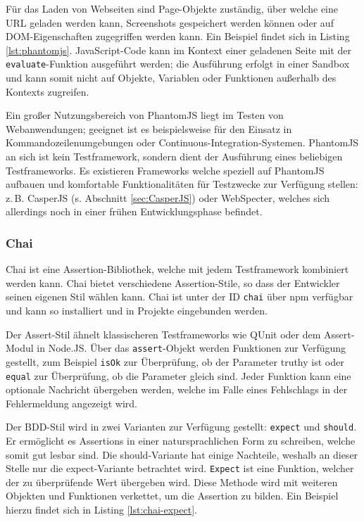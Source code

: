 Für das Laden von Webseiten sind Page-Objekte zuständig, über welche eine URL geladen werden kann, Screenshots gespeichert werden können oder auf DOM-Eigenschaften zugegriffen werden kann. Ein Beispiel findet sich in Listing \ref{lst:phantomjs}. JavaScript-Code kann im Kontext einer geladenen Seite mit der \texttt{evaluate}-Funktion ausgeführt werden; die Ausführung erfolgt in einer Sandbox und kann somit nicht auf Objekte, Variablen oder Funktionen außerhalb des Kontexts zugreifen.\cite{phantomjs-quickstart}

\begin{figure}[H]
	
\end{figure}

Ein großer Nutzungsbereich von PhantomJS liegt im Testen von Webanwendungen; geeignet ist es beispielsweise für den Einsatz in Kommandozeilenumgebungen oder Continuous-Integration-Systemen. PhantomJS an sich ist kein Testframework, sondern dient der Ausführung eines beliebigen Testframeworks. Es existieren Frameworks welche speziell auf PhantomJS aufbauen und komfortable Funktionalitäten für Testzwecke zur Verfügung stellen: z.\,B. CasperJS (s. Abschnitt \ref{sec:CasperJS}) oder WebSpecter, welches sich allerdings noch in einer frühen Entwicklungsphase befindet.\cite{phantomjs-testing}

\subsubsection{Chai}
\label{sec:Chai}
Chai ist eine Assertion-Bibliothek, welche mit jedem Testframework kombiniert werden kann. Chai bietet verschiedene Assertion-Stile, so dass der Entwickler seinen eigenen Stil wählen kann.\cite{chai-index} Chai ist unter der ID \texttt{chai} über npm verfügbar und kann so installiert und in Projekte eingebunden werden\cite{chai-installation}.

Der Assert-Stil ähnelt klassischeren Testframeworks wie QUnit oder dem Assert-Modul in Node.JS. Über das \texttt{assert}-Objekt werden Funktionen zur Verfügung gestellt, zum Beispiel \texttt{isOk} zur Überprüfung, ob der Parameter truthy ist oder \texttt{equal} zur Überprüfung, ob die Parameter gleich sind. Jeder Funktion kann eine optionale Nachricht übergeben werden, welche im Falle eines Fehlschlags in der Fehlermeldung angezeigt wird.\cite{chai-assert}

Der BDD-Stil wird in zwei Varianten zur Verfügung gestellt: \texttt{expect} und \texttt{should}. Er ermöglicht es Assertions in einer natursprachlichen Form zu schreiben, welche somit gut lesbar sind. Die should-Variante hat einige Nachteile, weshalb an dieser Stelle nur die expect-Variante betrachtet wird. \texttt{Expect} ist eine Funktion, welcher der zu überprüfende Wert übergeben wird. Diese Methode wird mit weiteren Objekten und Funktionen verkettet, um die Assertion zu bilden.\cite{chai-styles} Ein Beispiel hierzu findet sich in Listing \ref{lst:chai-expect}.

